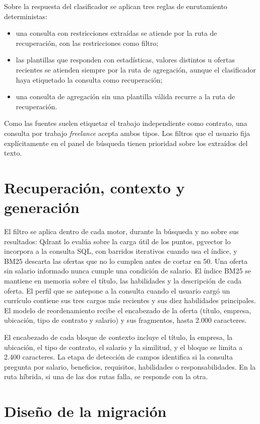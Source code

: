 Sobre la respuesta del clasificador se aplican tres reglas de enrutamiento deterministas:
\begin{itemize}
    \item una consulta con restricciones extraídas se atiende por la ruta de recuperación, con las restricciones como filtro;
    \item las plantillas que responden con estadísticas, valores distintos u ofertas recientes se atienden siempre por la ruta de agregación, aunque el clasificador haya etiquetado la consulta como recuperación;
    \item una consulta de agregación sin una plantilla válida recurre a la ruta de recuperación.
\end{itemize}
Como las fuentes suelen etiquetar el trabajo independiente como contrato, una consulta por trabajo \textit{freelance} acepta ambos tipos. Los filtros que el usuario fija explícitamente en el panel de búsqueda tienen prioridad sobre los extraídos del texto.

\section{Recuperación, contexto y generación}

El filtro se aplica dentro de cada motor, durante la búsqueda y no sobre sus resultados: Qdrant lo evalúa sobre la carga útil de los puntos, pgvector lo incorpora a la consulta SQL, con barridos iterativos cuando usa el índice, y BM25 descarta las ofertas que no lo cumplen antes de cortar en 50. Una oferta sin salario informado nunca cumple una condición de salario. El índice BM25 se mantiene en memoria sobre el título, las habilidades y la descripción de cada oferta. El perfil que se antepone a la consulta cuando el usuario cargó un currículo contiene sus tres cargos más recientes y sus diez habilidades principales. El modelo de reordenamiento recibe el encabezado de la oferta (título, empresa, ubicación, tipo de contrato y salario) y sus fragmentos, hasta 2.000 caracteres.

El encabezado de cada bloque de contexto incluye el título, la empresa, la ubicación, el tipo de contrato, el salario y la similitud, y el bloque se limita a 2.400 caracteres. La etapa de detección de campos identifica si la consulta pregunta por salario, beneficios, requisitos, habilidades o responsabilidades. En la ruta híbrida, si una de las dos rutas falla, se responde con la otra.

\section{Diseño de la migración}
\label{anx:migracion}


